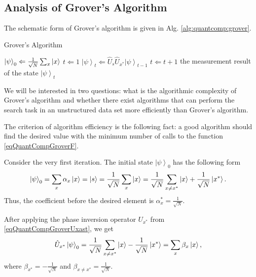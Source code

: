 \subsection{Analysis of Grover's Algorithm}

The schematic form of Grover's algorithm is given in Alg.
\ref{alg:quantcomp:grover}.  
\begin{algorithm}
\caption{Grover's Algorithm}
\label{alg:quantcomp:grover}
\begin{algorithmic}
    \STATE $\left|\psi\right>_0 \Leftarrow \frac{1}{\sqrt{N}}\sum_x 
    \ket{x}$
    \STATE $t \Leftarrow 1$
    \REPEAT
    \STATE $\left|\psi\right>_t \Leftarrow \hat{U}_s\hat{U}_{x^{\ast}}
    \left|\psi\right>_{t-1}$
    \STATE $t \Leftarrow t + 1$
    \RETURN the measurement result of the state $\left|\psi\right>_t$
\end{algorithmic}
\end{algorithm}

We will be interested in two questions: what is the algorithmic complexity
of Grover's algorithm and whether there exist algorithms that can perform
the search task in an unstructured data set more efficiently than
Grover's algorithm.

The criterion of algorithm efficiency is the following fact: a good
algorithm should find the desired value with the minimum number of calls
to the function \eqref{eqQuantCompGroverF}.

Consider the very first iteration. The initial state
$\left|\psi\right>_0$ has the following form
\begin{equation}
\left|\psi\right>_0 =
\sum_x \alpha_x \ket{x} =  
\ket{s} = 
\frac{1}{\sqrt{N}}\sum_x \ket{x} = 
\frac{1}{\sqrt{N}}\sum_{x\ne x^{\ast}} \ket{x} +
\frac{1}{\sqrt{N}} \left|x^{\ast}\right>.
\nonumber
\end{equation}
Thus, the coefficient before the desired element is
$\alpha_x^{\ast} = \frac{1}{\sqrt{N}}$. 

After applying the phase inversion operator $U_{x^{\ast}}$ from \eqref{eqQuantCompGroverUxast}, we get
\begin{equation}
\hat{U}_{x^{\ast}} \left|\psi\right>_0 =
\frac{1}{\sqrt{N}}\sum_{x\ne x^{\ast}} \ket{x} - 
\frac{1}{\sqrt{N}} \left|x^{\ast}\right> = \sum_x \beta_x \ket{x},
\nonumber
\end{equation}
where $\beta_{x^\ast} = - \frac{1}{\sqrt{N}}$ and $\beta_{x \ne x^\ast} =
\frac{1}{\sqrt{N}}$. 

